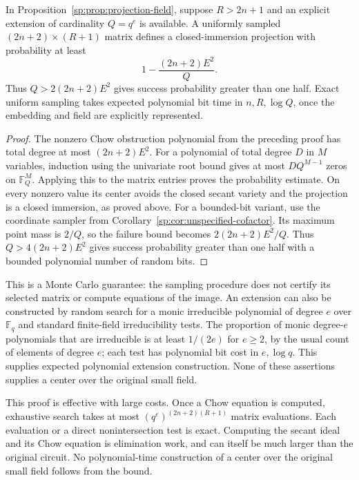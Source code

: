 \begin{corollary}
\label{sp:cor:random-projection}
In Proposition~\ref{sp:prop:projection-field}, suppose $R>2n+1$ and
an explicit extension of cardinality $Q=q^e$ is available. A uniformly
sampled $(2n+2)\times(R+1)$ matrix defines a closed-immersion projection
with probability at least
\[
 1-\frac{(2n+2)E^2}{Q}.
\]
Thus $Q>2(2n+2)E^2$ gives success probability greater than one half.
Exact uniform sampling takes expected polynomial bit time in
$n,R,\log Q$, once the embedding
and field are explicitly represented.
\end{corollary}
\begin{proof}
The nonzero Chow obstruction polynomial from the preceding proof has
total degree at most $(2n+2)E^2$. For a polynomial of total degree
$D$ in $M$ variables, induction using the univariate root bound gives
at most $D Q^{M-1}$ zeros on $\mathbb F_Q^M$. Applying this to the
matrix entries proves the probability estimate. On every nonzero
value its center avoids the closed secant variety and the projection
is a closed immersion, as proved above.
For a bounded-bit variant, use the coordinate sampler from
Corollary~\ref{sp:cor:unspecified-cofactor}. Its maximum point mass
is $2/Q$, so the failure bound becomes $2(2n+2)E^2/Q$.
Thus $Q>4(2n+2)E^2$ gives success probability greater than one half
with a bounded polynomial number of random bits.
\end{proof}

This is a Monte Carlo guarantee: the sampling procedure does not
certify its selected matrix or compute equations of the image. An
extension can also be constructed by random search for a monic
irreducible polynomial of degree $e$ over $\mathbb F_q$ and standard
finite-field irreducibility tests. The proportion of monic degree-$e$
polynomials that are irreducible is at least $1/(2e)$ for $e\geq2$,
by the usual count of elements of degree $e$; each test has polynomial
bit cost in $e,\log q$. This supplies expected polynomial extension
construction. None of these assertions supplies a center over the
original small field.

This proof is effective with large costs. Once a Chow equation is
computed, exhaustive search takes at most
$(q^e)^{(2n+2)(R+1)}$ matrix evaluations. Each evaluation or a direct
nonintersection test is exact. Computing the secant ideal and its Chow
equation is elimination work, and can itself be much larger than the
original circuit. No polynomial-time construction of a center over
the original small field follows from the bound.

